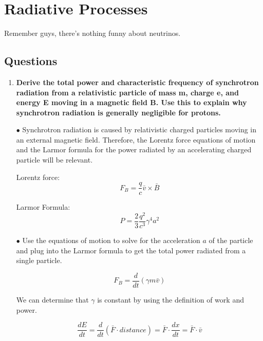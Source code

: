 \section{Radiative Processes}

Remember guys, there's nothing funny about neutrinos.

\subsection{Questions}

\begin{enumerate}

\item \textbf{Derive the total power and characteristic frequency of synchrotron radiation from
      a relativistic particle of mass m, charge e, and energy E moving in a magnetic field B.
      Use this to explain why synchrotron radiation is generally negligible for protons.}
      
      $\bullet$ Synchrotron radiation is caused by relativistic charged particles moving in an external magnetic field. Therefore, the Lorentz force equations of motion and the Larmor formula for the power radiated by an accelerating charged particle will be relevant. 
      
      Lorentz force: 
      \begin{equation}
      F_{B} = \frac{q}{c} \bar{v} \times \bar{B}
      \end{equation}
      
      Larmor Formula:
      \begin{equation}
      P = \frac{2}{3} \frac{q^{2}}{c^{3}} \gamma^{4} a^{2}
      \end{equation}
      
      $\bullet$ Use the equations of motion to solve for the acceleration $a$ of the particle and plug into the Larmor formula to get the total power radiated from a single particle.
      
      \begin{equation}
      F_{B} = \frac{d}{dt} (\gamma m \bar{v})
      \end{equation}
      
      We can determine that $\gamma$ is constant by using the definition of work and power.
      
      \begin{equation}
      \frac{dE}{dt} = \frac{d}{dt} (\bar{F} \cdot distance) = \bar{F} \cdot \frac{dx}{dt} = \bar{F} \cdot \bar{v}
      \end{equation}
      

\end{enumerate}
